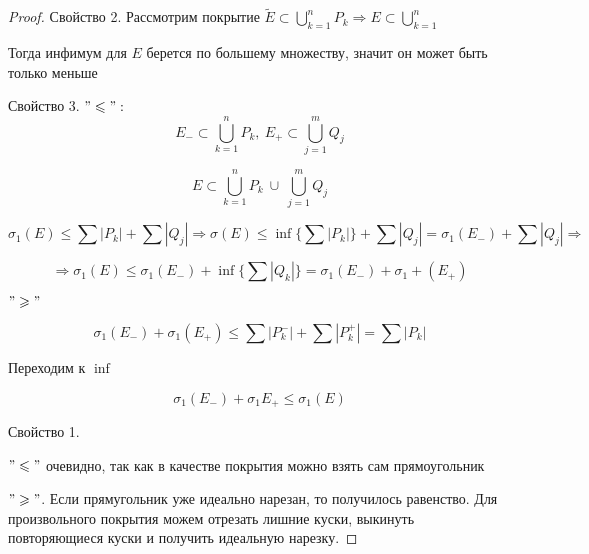 \begin{proof}
    Свойство 2. Рассмотрим покрытие $\widetilde{E} \subset \bigcup\limits_{k=1}^n P_k
    \Rightarrow E \subset \bigcup\limits_{k=1}^n$

    Тогда инфимум для $E$ берется по большему множеству, значит он может быть только меньше

    Свойство 3. $"\leqslant":$
    \[E_{-} \subset \bigcup\limits_{k=1}^n P_k,\ 
    E_{+} \subset \bigcup\limits_{j=1}^m Q_j\]

    \[E \subset \bigcup\limits_{k=1}^n P_k\ \cup\ \bigcup\limits_{j=1}^m Q_j\]

    \[\sigma_1(E) \leqslant \sum |P_k| + \sum |Q_j| \Rightarrow \sigma(E) \leqslant \inf
    \Big\{ \sum |P_k| \Big\} + \sum |Q_j| = \sigma_1(E_{-}) + \sum |Q_j| \Rightarrow \]

    \[ \Rightarrow \sigma_1(E) \leqslant \sigma_1(E_{-}) + \inf \Big\{ \sum |Q_k| \Big\} =
    \sigma_1(E_{-}) + \sigma_1 + (E_{+}) \]

    $"\geqslant"$

    \[ \sigma_1(E_{-}) + \sigma_1(E_{+}) \leqslant \sum |P_k^{-}| + \sum |P_k^{+}| = \sum |P_k|\]

    Переходим к $\inf$

    \[ \sigma_1(E_{-}) + \sigma_1{E_{+}} \leqslant \sigma_1(E) \]

    Свойство 1.

    $"\leqslant"$ очевидно, так как в качестве покрытия можно взять сам прямоугольник

    $"\geqslant"$. Если прямугольник уже идеально нарезан, то получилось равенство.
    Для произвольного покрытия можем отрезать лишние куски, выкинуть повторяющиеся куски и получить идеальную нарезку.
\end{proof} 
